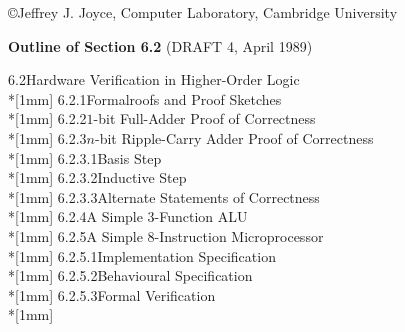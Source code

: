 \pagestyle{myheadings}

\oddsidemargin  -5mm
\evensidemargin -5mm
\textheight 23cm
\textwidth  17cm

\renewcommand{\bottomfraction}{.7}

\setlength{\parskip}{\baselineskip}
\setlength{\parindent}{0in}



\begin{normalsize}

\copyright Jeffrey J. Joyce, Computer Laboratory, Cambridge University

{\large\bf Outline of Section 6.2} (DRAFT 4, April 1989)

6.2{\hspace*{4mm}}Hardware Verification in Higher-Order Logic\\*[1mm]
6.2.1{\hspace*{4mm}}Formal{\hspace*{4mm}}roofs and Proof Sketches\\*[1mm]
6.2.2{\hspace*{4mm}}\mbox{$1$-bit} Full-Adder Proof of Correctness\\*[1mm]
6.2.3{\hspace*{4mm}}\mbox{$n$-bit} Ripple-Carry Adder Proof of Correctness\\*[1mm]
6.2.3.1{\hspace*{4mm}}Basis Step\\*[1mm]
6.2.3.2{\hspace*{4mm}}Inductive Step\\*[1mm]
6.2.3.3{\hspace*{4mm}}Alternate Statements of Correctness\\*[1mm]
6.2.4{\hspace*{4mm}}A Simple 3-Function ALU\\*[1mm]
6.2.5{\hspace*{4mm}}A Simple 8-Instruction Microprocessor\\*[1mm]
6.2.5.1{\hspace*{4mm}}Implementation Specification\\*[1mm]
6.2.5.2{\hspace*{4mm}}Behavioural Specification\\*[1mm]
6.2.5.3{\hspace*{4mm}}Formal Verification\\*[1mm]

\end{normalsize}
